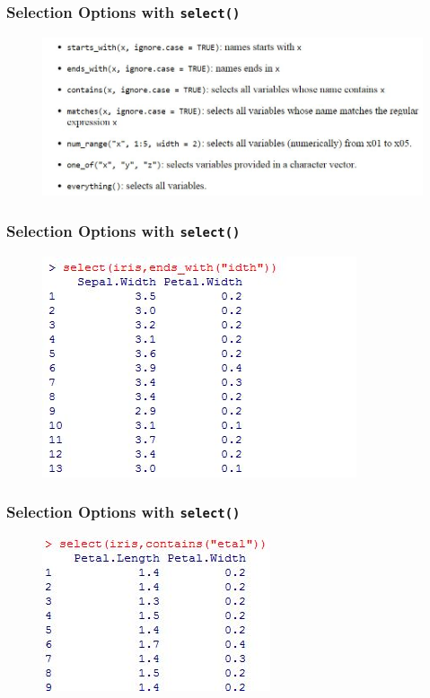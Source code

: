 \documentclass{beamer}
\begin{document}
\begin{frame}
\frametitle{Selection Options with \texttt{select()}}
\begin{figure}
\centering
\includegraphics[width=01.05\linewidth]{selectoptions}
\end{figure}

\end{frame}
\begin{frame}
	\frametitle{Selection Options with \texttt{select()}}
	
	\begin{figure}
		\centering
		\includegraphics[width=0.69\linewidth]{selectendswith}
	\end{figure}
	
\end{frame}


\begin{frame}
\frametitle{Selection Options with \texttt{select()}}

\begin{figure}
\centering
\includegraphics[width=0.69\linewidth]{selectioncontaints}
\end{figure}

\end{frame}
\end{document}
